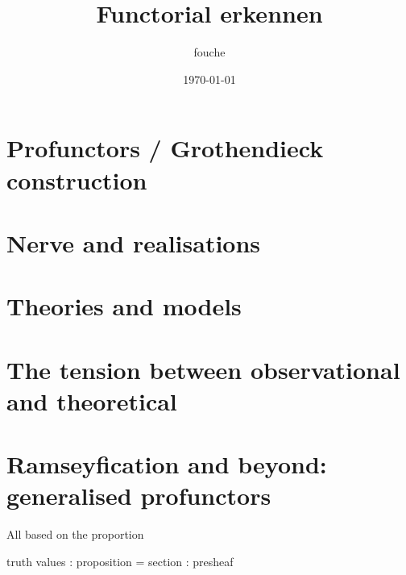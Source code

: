 \documentclass[11pt]{article}
\author{fouche}
\date{\today}
\title{Functorial erkennen}
\begin{document}
\maketitle
\tableofcontents


\section{Profunctors / Grothendieck construction}
\label{sec:org7dd09e1}
\section{Nerve and realisations}
\label{sec:org1a423df}
\section{Theories and models}
\label{sec:orge02f333}
\section{The tension between observational and theoretical}
\label{sec:orge11c3c4}
\section{Ramseyfication and beyond: generalised profunctors}
\label{sec:org50db6c2}

All based on the proportion

truth values : proposition = section : presheaf
\end{document}
